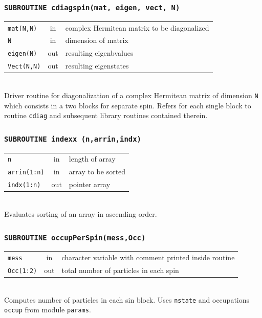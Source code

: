 \documentclass[final,1p]{elsarticle}
\begin{document}
\subsubsection*{\tt SUBROUTINE cdiagspin(mat, eigen, vect, N)}
\begin{tabular}{lcl}
 {\tt mat(N,N)} & in & complex Hermitean matrix to be diagonalized\\
 {\tt N} & in & dimension of matrix\\
 {\tt eigen(N)} & out & resulting eigenbvalues\\
 {\tt Vect(N,N)} & out & resulting eigenstates\\
\end{tabular}
\\[4pt]
Driver routine for diagonalization of a complex Hermitean matrix of
dimension {\tt N} which consists in a two blocks for separate spin.
Refers for each single block to routine {\tt cdiag} and subsequent
library routines contained therein.


\subsubsection*{\tt SUBROUTINE indexx (n,arrin,indx)}
\begin{tabular}{lcl}
 {\tt n} & in & length of array\\
 {\tt arrin(1:n)} & in & array to be sorted\\
 {\tt indx(1:n)} & out & pointer array \\
\end{tabular}
\\[4pt]
Evaluates sorting of an array in ascending order.



\subsubsection*{\tt SUBROUTINE occupPerSpin(mess,Occ)}
\begin{tabular}{lcl}
 {\tt mess} & in & character variable with comment printed inside routine\\
 {\tt Occ(1:2)} & out & total number of particles in each spin\\
\end{tabular}
\\[4pt]
Computes number of particles in each sin block. Uses {\tt nstate} and
occupations {\tt occup} from module {\tt params}.
\end{document}
